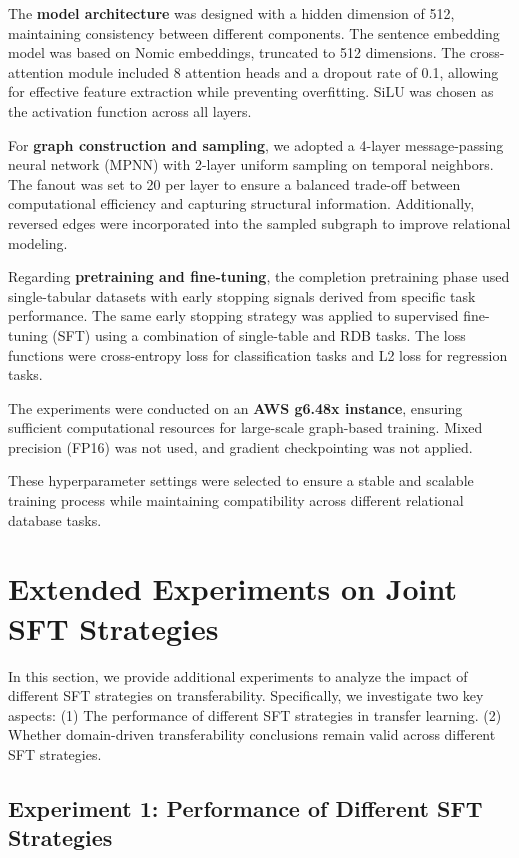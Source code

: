 \documentclass{article}
\theoremstyle{plain}
\theoremstyle{definition}
\theoremstyle{remark}
\begin{document}
The \textbf{model architecture} was designed with a hidden dimension of 512, maintaining consistency between different components. The sentence embedding model was based on Nomic embeddings, truncated to 512 dimensions. The cross-attention module included 8 attention heads and a dropout rate of 0.1, allowing for effective feature extraction while preventing overfitting. SiLU was chosen as the activation function across all layers.  

For \textbf{graph construction and sampling}, we adopted a 4-layer message-passing neural network (MPNN) with 2-layer uniform sampling on temporal neighbors. The fanout was set to 20 per layer to ensure a balanced trade-off between computational efficiency and capturing structural information. Additionally, reversed edges were incorporated into the sampled subgraph to improve relational modeling.  

Regarding \textbf{pretraining and fine-tuning}, the completion pretraining phase used single-tabular datasets with early stopping signals derived from specific task performance. The same early stopping strategy was applied to supervised fine-tuning (SFT) using a combination of single-table and RDB tasks. The loss functions were cross-entropy loss for classification tasks and L2 loss for regression tasks.  

The experiments were conducted on an \textbf{AWS g6.48x instance}, ensuring sufficient computational resources for large-scale graph-based training. Mixed precision (FP16) was not used, and gradient checkpointing was not applied.  

These hyperparameter settings were selected to ensure a stable and scalable training process while maintaining compatibility across different relational database tasks.

\section{Extended Experiments on Joint SFT Strategies}
\label{app:SFT}

In this section, we provide additional experiments to analyze the impact of different SFT strategies on transferability. Specifically, we investigate two key aspects:  
(1) The performance of different SFT strategies in transfer learning.  
(2) Whether domain-driven transferability conclusions remain valid across different SFT strategies.

\subsection{Experiment 1: Performance of Different SFT Strategies}
\end{document}
